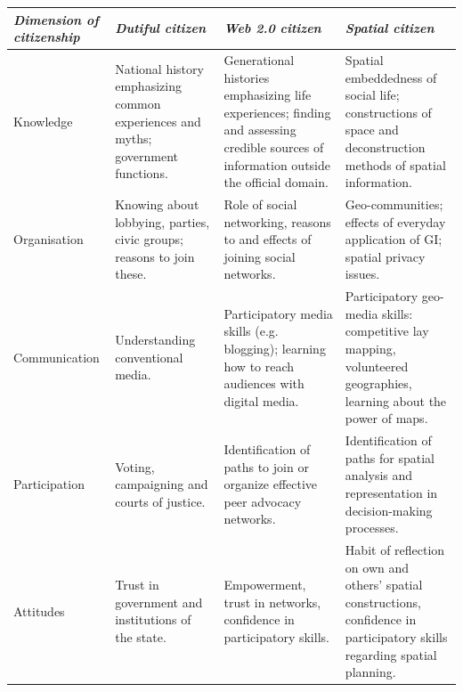 { \RaggedRight
\begin{tabularx}{\linewidth}{ p{30mm} | X X X}
    {\small\textit{Dimension of citizenship}}
    & {\small\textit{Dutiful citizen}} 
    & {\small\textit{Web 2.0 citizen}}
    & {\small\textit{Spatial citizen}}\\
    \midrule
    \small Knowledge 
    & \footnotesize National history emphasizing common experiences and myths; government functions. 
    & \footnotesize Generational histories emphasizing life experiences; finding and assessing credible sources of information outside the official domain. 
    & \footnotesize Spatial embeddedness of social life; constructions of space and deconstruction methods of spatial information.  \\
    \hline
    \small Organisation 
    & \footnotesize Knowing about lobbying, parties, civic groups; reasons to join these. 
    & \footnotesize Role of social networking, reasons to and effects of joining social networks.
    & \footnotesize Geo-communities; effects of everyday application of GI; spatial privacy issues.  \\
    \hline
    \small Communication 
    & \footnotesize Understanding conventional media. 
    & \footnotesize Participatory media skills (e.g. blogging); learning how to reach audiences with digital media. 
    & \footnotesize Participatory geo-media skills: competitive lay mapping, volunteered geographies, learning about the power of maps.  \\
    \hline
    \small Participation 
    & \footnotesize Voting, campaigning and courts of justice. 
    & \footnotesize Identification of paths to join or organize effective peer advocacy networks.
    & \footnotesize Identification of paths for spatial analysis and representation in decision-making processes.  \\
    \hline
    \small Attitudes 
    & \footnotesize Trust in government and institutions of the state. 
    & \footnotesize Empowerment, trust in networks, confidence in participatory skills. 
    & \footnotesize Habit of reflection on own and others' spatial constructions, confidence in participatory skills regarding spatial planning.  \\
    
\end{tabularx}
}
~\label{tab:SpatialCitizen}

